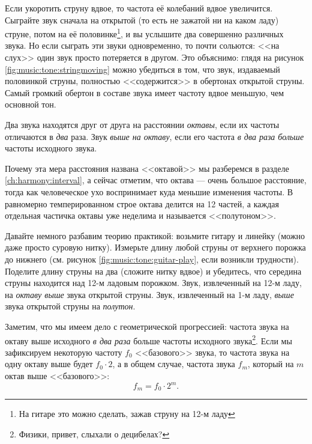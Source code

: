 Если укоротить струну вдвое, то частота её колебаний вдвое увеличится. Сыграйте звук сначала на открытой (то есть не зажатой ни на каком ладу) струне, потом на её половинке\footnote{На гитаре это можно сделать, зажав струну на 12-м ладу}, и вы услышите два совершенно различных звука. Но если сыграть эти звуки одновременно, то почти сольются: <<на слух>> один звук просто потеряется в другом. Это объяснимо: глядя на рисунок \ref{fig:music:tone:stringmoving} можно убедиться в том, что звук, издаваемый половинкой струны, полностью <<содержится>> в обертонах открытой струны. Самый громкий обертон в составе звука имеет частоту вдвое меньшую, чем основной тон.

\begin{Definition}[Октава]
    Два звука находятся друг от друга на расстоянии \emph{октавы}, если их частоты отличаются в \emph{два} раза. Звук \emph{выше на октаву}, если его частота \emph{в два раза больше} частоты исходного звука. 
\end{Definition}

Почему эта мера расстояния названа <<октавой>> мы разберемся в разделе \ref{ch:harmony:interval}, а сейчас отметим, что октава --- очень большое расстояние, тогда как человеческое ухо воспринимает куда меньшие изменения частоты. В равномерно темперированном строе октава делится на 12 частей, а каждая отдельная частичка октавы уже неделима и называется <<полутоном>>.

\begin{Example}
    Давайте немного разбавим теорию практикой: возьмите гитару и линейку (можно даже просто суровую нитку). Измерьте длину любой струны от верхнего порожка до нижнего (см. рисунок \ref{fig:music:tone:guitar-play}, если возникли трудности). Поделите длину струны на два (сложите нитку вдвое) и убедитесь, что середина струны находится над 12-м ладовым порожком. Звук, извлеченный на 12-м ладу, на \emph{октаву выше} звука открытой струны. Звук, извлеченный на 1-м ладу, \emph{выше} звука открытой струны на \emph{полутон}.
\end{Example}

Заметим, что мы имеем дело с геометрической прогрессией: частота звука на октаву выше исходного \emph{в два раза} больше частоты исходного звука\footnote{Физики, привет, слыхали о децибелах?}. Если мы зафиксируем некоторую частоту $f_0$ <<базового>> звука, то частота звука на одну октаву выше будет $f_0\cdot 2$, а в общем случае, частота звука $f_m$, который на $m$ октав выше <<базового>>:
\[
    f_m = f_0\cdot 2^m.
\]

